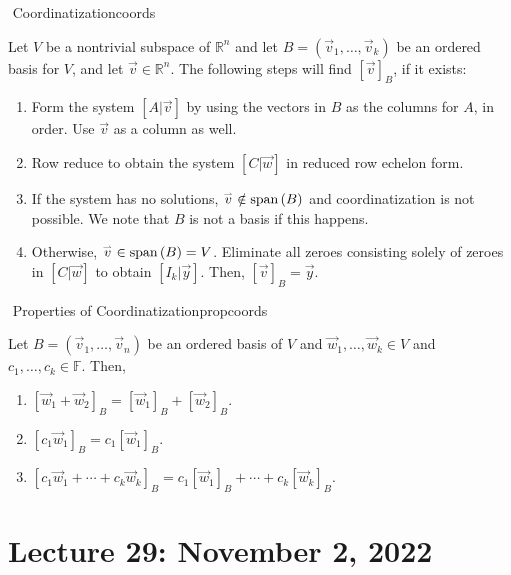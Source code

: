         \begin{theorem}{\Stop\,\,Coordinatization}{coords}

            Let \(V\) be a nontrivial subspace of \(\mathbb{R}^n\) and let \(B=(\vec{v}_1,\ldots,\vec{v}_k)\) be an ordered basis for \(V\), and let \(\vec{v}\in\mathbb{R}^n\). The following steps will find \([\vec{v}]_B\), if it exists:
            \begin{enumerate}
                \item Form the system \([A|\vec{v}]\) by using the vectors in \(B\) as the columns for \(A\), in order. Use \(\vec{v}\) as a column as well.
                \item Row reduce to obtain the system \([C|\vec{w}]\) in reduced row echelon form.
                \item If the system has no solutions, \(\overset{_{\rightharpoonup}}{v}\notin\text{span\,}(B)\) and coordinatization is not possible. We note that \(B\) is not a basis if this happens.
                \item Otherwise, \(\overset{_{\rightharpoonup}}{v}\in\text{span\,}(B)=V\). Eliminate all zeroes consisting solely of zeroes in \([C|\vec{w}]\) to obtain \([I_k|\vec{y}]\). Then, \([\vec{v}]_B=\vec{y}\).
            \end{enumerate}

        \end{theorem}
        \begin{theorem}{\Stop\,\,Properties of Coordinatization}{propcoords}

            Let \(B=(\vec{v}_1,\ldots,\vec{v}_n)\) be an ordered basis of \(V\) and \(\vec{w}_1,\ldots,\vec{w}_k\in V\) and \(c_1,\ldots,c_k\in\mathbb{F}\). Then,
            \begin{enumerate}
                \item \([\vec{w}_1+\vec{w}_2]_B=[\vec{w}_1]_B+[\vec{w}_2]_B\).
                \item \([c_1\vec{w}_1]_B=c_1[\vec{w}_1]_B\).
                \item \([c_1\vec{w}_1+\cdots+c_k\vec{w}_k]_B=c_1[\vec{w}_1]_B+\cdots+c_k[\vec{w}_k]_B\).
            \end{enumerate}
            
        \end{theorem}

\section{Lecture 29: November 2, 2022}

